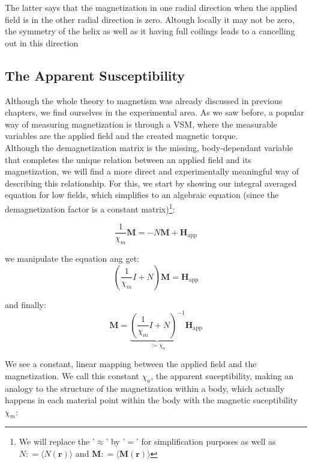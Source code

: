 The latter says that the magnetization in one radial direction when the applied field is in the other radial direction is zero. Altough locally it may not be zero, the symmetry of the helix as well as it having full coilings leads to a cancelling out in this direction \\

\subsection{The Apparent Susceptibility}

Although the whole theory to magnetism was already discussed in previous chapters, we find ourselves in the experimental area. As we saw before, a popular way of measuring magnetization is through a VSM, where the measurable variables are the applied field and the created magnetic torque.\\

Although the demagnetization matrix is the missing, body-dependant variable that completes the unique relation between an applied field and its magnetization, we will find a more direct and experimentally meaningful way of describing this relationship. For this, we start by showing our integral averaged equation for low fields, which simplifies to an algebraic equation (since the demagnetization factor is a constant matrix)\footnote{We will replace the '$\approx$' by '$=$' for simplification purposes as well as $N : = \langle N(\textbf{r})\rangle$ and $\textbf{M} : = \langle \textbf{M}(\textbf{r})\rangle$}:

\begin{equation}
\frac{1}{\chi_m}\textbf{M} =  -N\textbf{M}  + \textbf{H}_\text{app}
\end{equation}

we manipulate the equation ang get:
\begin{equation}
\left(\frac{1}{\chi_m}I+N\right) \textbf{M} = \textbf{H}_\text{app}
\end{equation}

and finally:
\begin{equation}
 \textbf{M} = \underbrace{\left(\frac{1}{\chi_m}I+N\right)^{-1}}_{:= \chi_a}\textbf{H}_\text{app}
\end{equation}

We see a constant, linear mapping between the applied field and the magnetization. We call this constant $\chi_a$, the apparent suceptibility, making an analogy to the structure of the magnetization within a body, which actually happens in each material point within the body with the magnetic suceptibility $\chi_m$:

